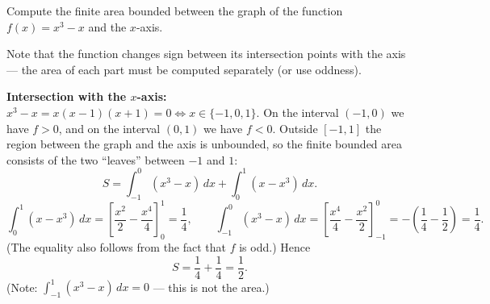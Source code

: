
\begin{question}
Compute the finite area bounded between the graph of the function $f(x)=x^3-x$ and the $x$-axis.
\end{question}

\begin{hint}
Note that the function changes sign between its intersection points with the axis --- the area of each part must be computed separately (or use oddness).
\end{hint}

\begin{solution}
\textbf{Intersection with the $x$-axis:} $x^3-x=x(x-1)(x+1)=0\iff x\in\{-1,0,1\}$.
On the interval $(-1,0)$ we have $f>0$, and on the interval $(0,1)$ we have $f<0$. Outside $[-1,1]$ the region between the graph and the axis is unbounded, so the finite bounded area consists of the two ``leaves'' between $-1$ and $1$:
\[ S=\int_{-1}^0(x^3-x)\,dx+\int_0^1(x-x^3)\,dx. \]
\[ \int_0^1(x-x^3)\,dx=\left[\frac{x^2}{2}-\frac{x^4}{4}\right]_0^1=\frac14,\qquad \int_{-1}^0(x^3-x)\,dx=\left[\frac{x^4}{4}-\frac{x^2}{2}\right]_{-1}^0=-\left(\frac14-\frac12\right)=\frac14. \]
(The equality also follows from the fact that $f$ is odd.) Hence
\[ S=\frac14+\frac14=\boxed{\frac12}. \]
(Note: $\int_{-1}^1(x^3-x)\,dx=0$ --- this is not the area.)
\end{solution}
